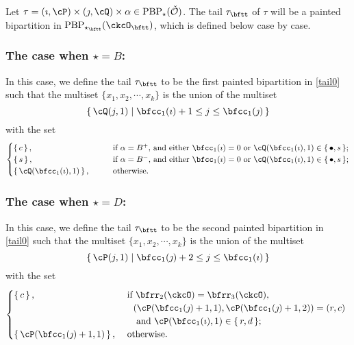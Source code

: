 \documentclass[12pt,a4paper]{amsart}
\newcommand{\CO}{{\mathcal {O}}}
\numberwithin{equation}{section}
\theoremstyle{remark}
\def\PBP{\mathrm{PBP}}
\begin{document}
\medskip


Let $ \tau=(\imath,\cP)\times(\jmath,\cQ)\times \alpha \in
\mathrm{PBP}_\star(\check \CO) $. The tail $\tau_\bftt$ of $\tau$ will be a painted bipartition in
$\PBP_{\star_\bftt}(\ckcO_\bftt)$, which is defined below case by case.

\subsubsection*{The case when $\star = B$:}
In this case, we define the tail $\tau_\bftt$ to be the first painted bipartition in \eqref{tail0} such that the multiset $\{x_1, x_2, \cdots, x_k\}$ is the
union of the multiset
\[
  \set{\cQ(j,1)| \bfcc_{1}(\imath)+1 \leq j \leq  \bfcc_{1}(\jmath) }
\]
with the set
\[
  \begin{cases}
 \set{c}, &
 \qquad
  \text{if $\alpha = B^+$, and either $\bfcc_{1}(\imath)=0$ or $\cQ(\bfcc_{1}(\imath),1)\in \set{\bullet,s}$};  \\
 \set{s},&
  \qquad \text{if $\alpha = B^-$, and either $\bfcc_{1}(\imath)=0$ or $\cQ(\bfcc_{1}(\imath),1)\in \set{\bullet,s}$}; \\
\set{\cQ(\bfcc_{1}(\imath),1)},&
\qquad
\text{otherwise.}
\end{cases}
\]

\subsubsection*{The case when $\star = D$:}
In this case, we define the tail $\tau_\bftt$ to be the second painted
bipartition in \eqref{tail0} such that the multiset $\{x_1, x_2, \cdots, x_k\}$
is the union of the multiset
\[
\set{\cP(j,1)| \bfcc_{1}(\jmath)+2 \leq j \leq \bfcc_{1}(\imath)}
\]
with the set
\[
\begin{cases}
    \set{c},                          &
    \ \text{if $\bfrr_2(\ckcO)=\bfrr_3(\ckcO)$,}                                                                         \\
                                      & \quad \text{$(\cP(\bfcc_{1}(\jmath)+1,1) ,\cP(\bfcc_{1}(\jmath)+1,2)) = (r,c)$ } \\
                                      & \quad \text{ and $\cP(\bfcc_1(\imath),1)\in \set{r,d}$};                                       \\
    \set{\cP(\bfcc_{1}(\jmath)+1,1)}, &
    \    \text{otherwise.}
  \end{cases}
\]
\end{document}
